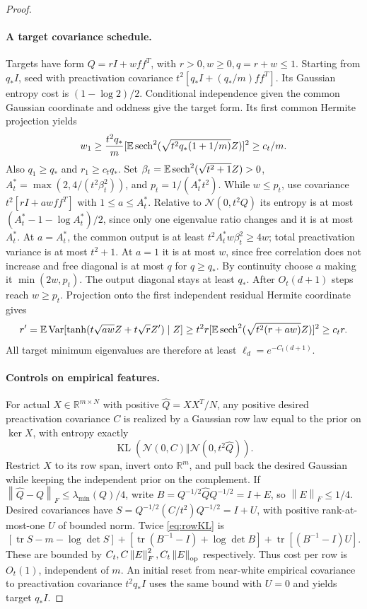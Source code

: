 \documentclass[11pt]{article}
\newcommand{\R}{\mathbb R}\newcommand{\E}{\mathbb E}\newcommand{\Pp}{\mathbb P}
\newcommand{\KL}{\operatorname{KL}}\newcommand{\tr}{\operatorname{tr}}
\newcommand{\norm}[1]{\left\lVert#1\right\rVert}
\newcommand{\cN}{\mathcal N}\newcommand{\one}{\mathbf 1}
\begin{document}
\begin{proof}
\paragraph{A target covariance schedule.}
Targets have form $Q=rI+wff^T$, with $r>0,w\ge0,q=r+w\le1$. Starting from $q_*I$, seed with preactivation covariance $t^2[q_*I+(q_*/m)ff^T]$. Its Gaussian entropy cost is $(1-\log2)/2$. Conditional independence given the common Gaussian coordinate and oddness give the target form. Its first common Hermite projection yields
\[
 w_1\ge\frac{t^2q_*}{m}[\E\sech^2(\sqrt{t^2q_*(1+1/m)}Z)]^2\ge c_t/m.
\]
Also $q_1\ge q_*$ and $r_1\ge c_tq_*$.
Set $\beta_t=\E\sech^2(\sqrt{t^2+1}Z)>0$, $A_t^*=\max(2,4/(t^2\beta_t^2))$, and $p_t=1/(A_t^*t^2)$. While $w\le p_t$, use covariance $t^2[rI+awff^T]$ with $1\le a\le A_t^*$. Relative to $\cN(0,t^2Q)$ its entropy is at most $(A_t^*-1-\log A_t^*)/2$, since only one eigenvalue ratio changes and it is at most $A_t^*$. At $a=A_t^*$, the common output is at least $t^2A_t^*w\beta_t^2\ge4w$; total preactivation variance is at most $t^2+1$. At $a=1$ it is at most $w$, since free correlation does not increase and free diagonal is at most $q$ for $q\ge q_*$. By continuity choose $a$ making it $\min(2w,p_t)$. The output diagonal stays at least $q_*$. After $O_t(d+1)$ steps reach $w\ge p_t$.
Projection onto the first independent residual Hermite coordinate gives
\[
 r'=\E\operatorname{Var}[\tanh(t\sqrt{aw}Z+t\sqrt r Z')\mid Z]
 \ge t^2r[\E\sech^2(\sqrt{t^2(r+aw)}Z)]^2\ge c_tr.
\]
All target minimum eigenvalues are therefore at least $\ell_d=e^{-C_t(d+1)}$.

\paragraph{Controls on empirical features.}
For actual $X\in\R^{m\times N}$ with positive $\widehat Q=XX^T/N$, any positive desired preactivation covariance $C$ is realized by a Gaussian row law equal to the prior on $\ker X$, with entropy exactly
\begin{equation}\label{eq:rowKL}
 \KL(\cN(0,C)\Vert\cN(0,t^2\widehat Q)).
\end{equation}
Restrict $X$ to its row span, invert onto $\R^m$, and pull back the desired Gaussian while keeping the independent prior on the complement.
If $\norm{\widehat Q-Q}_F\le\lambda_{\min}(Q)/4$, write $B=Q^{-1/2}\widehat QQ^{-1/2}=I+E$, so $\norm E_F\le1/4$. Desired covariances have $S=Q^{-1/2}(C/t^2)Q^{-1/2}=I+U$, with positive rank-at-most-one $U$ of bounded norm. Twice \eqref{eq:rowKL} is
\[
 [\tr S-m-\log\det S]+[\tr(B^{-1}-I)+\log\det B]+\tr[(B^{-1}-I)U].
\]
These are bounded by $C_t,C\norm E_F^2,C_t\norm E_{\op}$ respectively. Thus cost per row is $O_t(1)$, independent of $m$. An initial reset from near-white empirical covariance to preactivation covariance $t^2q_*I$ uses the same bound with $U=0$ and yields target $q_*I$.


\end{proof}
\end{document}
